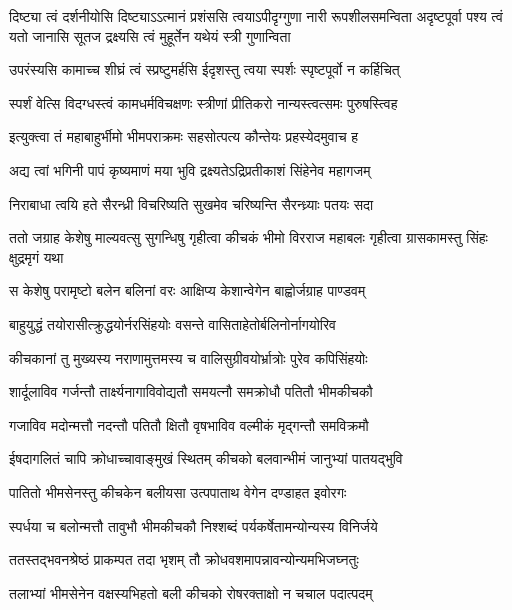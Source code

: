 \onelineshloka
{दिष्ट्या त्वं दर्शनीयोसि दिष्ट्याऽऽत्मानं प्रशंससि}
\threelineshloka
{त्वयाऽपीदृग्गुणा नारी रूपशीलसमन्विता}
{अदृष्टपूर्वा पश्य त्वं यतो जानासि सूतज}
{द्रक्ष्यसि त्वं मुहूर्तेन यथेयं स्त्री गुणान्विता}


\twolineshloka
{उपरंस्यसि कामाच्च शीघ्रं त्वं स्प्रष्टुमर्हसि}
{ईदृशस्तु त्वया स्पर्शः स्पृष्टपूर्वो न कर्हिचित्}


\twolineshloka
{स्पर्शं वेत्सि विदग्धस्त्वं कामधर्मविचक्षणः}
{स्त्रीणां प्रीतिकरो नान्यस्त्वत्समः पुरुषस्त्विह}



\twolineshloka
{इत्युक्त्वा तं महाबाहुर्भीमो भीमपराक्रमः}
{सहसोत्पत्य कौन्तेयः प्रहस्येदमुवाच ह}


\twolineshloka
{अद्य त्वां भगिनी पापं कृष्यमाणं मया भुवि}
{द्रक्ष्यतेऽद्रिप्रतीकाशं सिंहेनेव महागजम्}


\twolineshloka
{निराबाधा त्वयि हते सैरन्ध्री विचरिष्यति}
{सुखमेव चरिष्यन्ति सैरन्ध्र्याः पतयः सदा}


\onelineshloka
{ततो जग्राह केशेषु माल्यवत्सु सुगन्धिषु}
\twolineshloka
{गृहीत्वा कीचकं भीमो विरराज महाबलः}
{गृहीत्वा ग्रासकामस्तु सिंहः क्षुद्रमृगं यथा}


\twolineshloka
{स केशेषु परामृष्टो बलेन बलिनां वरः}
{आक्षिप्य केशान्वेगेन बाह्वोर्जग्राह पाण्डवम्}


\twolineshloka
{बाहुयुद्धं तयोरासीत्क्रुद्धयोर्नरसिंहयोः}
{वसन्ते वासिताहेतोर्बलिनोर्नागयोरिव}


\twolineshloka
{कीचकानां तु मुख्यस्य नराणामुत्तमस्य च}
{वालिसुग्रीवयोर्भ्रात्रोः पुरेव कपिसिंहयोः}


\twolineshloka
{शार्दूलाविव गर्जन्तौ तार्क्ष्यनागाविवोद्यतौ}
{समयत्नौ समक्रोधौ पतितौ भीमकीचकौ}


\twolineshloka
{गजाविव मदोन्मत्तौ नदन्तौ पतितौ क्षितौ}
{वृषभाविव वल्मीकं मृद्गन्तौ समविक्रमौ}


\twolineshloka
{ईषदागलितं चापि क्रोधाच्चावाङ्मुखं स्थितम्}
{कीचको बलवान्भीमं जानुभ्यां पातयद्भुवि}


\twolineshloka
{पातितो भीमसेनस्तु कीचकेन बलीयसा}
{उत्पपाताथ वेगेन दण्डाहत इवोरगः}


\twolineshloka
{स्पर्धया च बलोन्मत्तौ तावुभौ भीमकीचकौ}
{निश्शब्दं पर्यकर्षेतामन्योन्यस्य विनिर्जये}


\twolineshloka
{ततस्तद्भवनश्रेष्ठं प्राकम्पत तदा भृशम्}
{तौ क्रोधवशमापन्नावन्योन्यमभिजघ्नतुः}


\twolineshloka
{तलाभ्यां भीमसेनेन वक्षस्यभिहतो बली}
{कीचको रोषरक्ताक्षो न चचाल पदात्पदम्}


